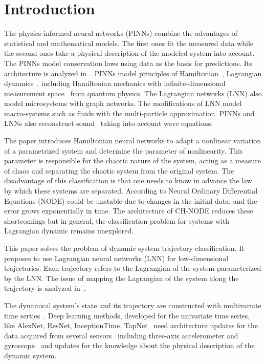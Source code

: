 \documentclass[12pt]{paper}
\begin{document}
\section{Introduction}

The physics-informed neural networks (PINNs) combine the advantages of statistical and mathematical models. The first ones fit the measured data while the second ones take a physical description of the modeled system into account. The PINNs model conservation laws using data as the basis for predictions. Its architecture is analyzed in~\cite{PINNreview}. PINNs model principles of Hamiltonian~\cite{HNN}, Lagrangian dynamics~\cite{article}, including Hamiltonian mechanics with infinite-dimensional measurement space~\cite{quantumHNN} from
quantum physics. The Lagrangian networks (LNN) also model microsystems with graph networks. The modifications of LNN model macro-systems such as fluids with the multi-particle approximation. PINNs and LNNs also reconstruct sound~\cite{PINNsoundwave} taking into account wave equations.  

The paper \cite{HNNadapt} introduces Hamiltonian neural networks to adapt a nonlinear variation of a parametrized system and determine the parameter of nonlinearity. This parameter is responsible for the chaotic nature of the system, acting as a measure of chaos and separating the chaotic system from the original system. The disadvantage of this classification is that one needs to know in advance the law by which these systems are separated. According to \cite{HNNrobustclass} Neural Ordinary Differential Equations (NODE) could be unstable due to changes in the initial data, and the error grows exponentially in time. The architecture of CH-NODE reduces these shortcomings but in general, the classification problem for systems with Lagrangian dynamic remains unexplored.

This paper solves the problem of dynamic system trajectory classification. It proposes to use Lagrangian neural networks (LNN) for low-dimensional trajectories. Each trajectory refers to the Lagrangian of the system parameterized by the LNN. The issue of mapping the Lagrangian of the system along the trajectory is analyzed in~\cite{article}.

The dynamical system's state and its trajectory are constructed with multivariate time serties~\cite{MTCSreview}. Deep learning methods, developed for the univariate time series, like AlexNet, ResNet, InceptionTime, TapNet~\cite{MTCSreview} need architecture updates for the data acquired from several sensors~\cite{MTCSindustrial} including three-axis accelerometer and gyroscope~\cite{MTCSactivity} and updates for the knowledge about the physical description of the dynamic system.
\end{document}
